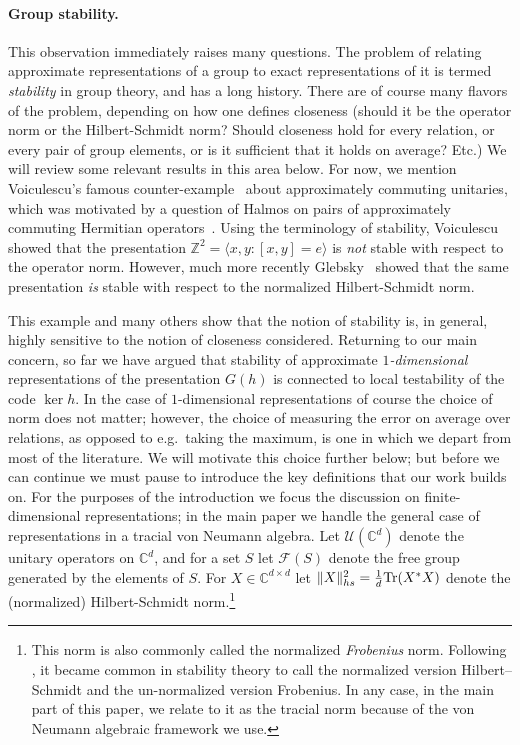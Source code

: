 \documentclass[11pt]{article}
\theoremstyle{definition}
\newcommand{\Tr}{\mbox{\rm Tr}}
\newcommand{\C}{\ensuremath{\mathbb{C}}}
\newcommand{\Z}{\ensuremath{\mathbb{Z}}}
\newcommand{\mF}{\ensuremath{\mathcal{F}}}
\newcommand{\mU}{\ensuremath{\mathcal{U}}}
\begin{document}
\paragraph{Group stability.}
This observation immediately raises many questions. The problem of relating approximate representations of a group to exact representations of it is termed \emph{stability} in group theory, and has a long history. There are of course many flavors of the problem, depending on how one defines closeness (should it be the operator norm or the Hilbert-Schmidt norm? Should closeness hold for every relation, or every pair of group elements, or is it sufficient that it holds on average? Etc.) We will review some relevant results in this area below. For now, we mention Voiculescu's famous counter-example~\cite{voiculescu1983asymptotically} about approximately commuting unitaries, which was motivated by a question of Halmos on pairs of approximately commuting Hermitian operators~\cite{halmos1976some}. Using the terminology of stability, Voiculescu showed that the presentation $\Z^2 = \langle x,y:[x,y]=e\rangle$ is \emph{not} stable with respect to the operator norm. However, much more recently Glebsky~\cite{glebsky2010almost} showed that the same presentation \emph{is} stable with respect to the normalized Hilbert-Schmidt norm. 

This example and many others show that the notion of stability is, in general, highly sensitive to the notion of closeness considered. Returning to our main concern, so far we have argued that 
stability of approximate \emph{$1$-dimensional} representations of the presentation $G(h)$ is connected to local testability of the code $\ker h$. In the case of $1$-dimensional representations of course the choice of norm does not matter; however, the choice of measuring the error on average over relations, as opposed to e.g.\ taking the maximum, is one in which we depart from most of the literature. We will motivate this choice further below; but before we can continue we must pause to introduce the key definitions that our work builds on. For the purposes of the introduction we focus the discussion on finite-dimensional representations; in the main paper we handle the general case of representations in a tracial von Neumann algebra. Let $\mU(\C^d)$ denote the unitary operators on $\C^d$, and for a set $S$ let $\mF(S)$ denote the free group generated by the elements of $S$. For $X\in \C^{d\times d}$ let $\|X\|_{hs}^2 = \frac{1}{d}\Tr(X^* X)$ denote the (normalized) Hilbert-Schmidt norm.\footnote{This norm is also commonly called the normalized \emph{Frobenius} norm. Following \cite{dechiffre_glebsky_lubotzky_thom_2020}, it became common in stability theory to call the normalized version Hilbert--Schmidt and the un-normalized version Frobenius. In any case, in the main part of this paper, we relate to it as the tracial norm because of the von Neumann algebraic framework we use.}
\end{document}
